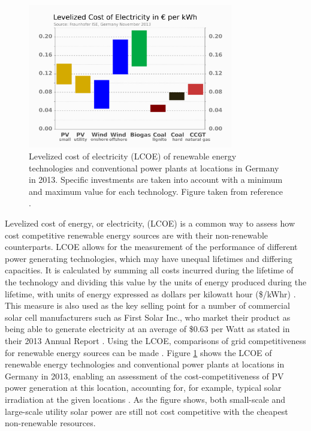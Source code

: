 \begin{figure}[h!]
  \centering
    \includegraphics[width=0.8\textwidth]{figures/LCOE.png}
    \caption{Levelized cost of electricity (LCOE) of renewable energy technologies and conventional power plants at locations in Germany in 2013.  Specific investments are taken into account with a minimum and maximum value for each technology. Figure taken from reference .}
  \label{LCOE}
\end{figure}

Levelized cost of energy, or electricity, (LCOE) is a common way to assess how cost competitive renewable energy sources are with their non-renewable counterparts. LCOE allows for the measurement of the performance of different power generating technologies, which may have unequal lifetimes and differing capacities. It is calculated by summing all costs incurred during the lifetime of the technology and dividing this value by the units of energy produced during the lifetime, with units of energy expressed as dollars per kilowatt hour (\$/kWhr) \cite{LCOE2}. This measure is also used as the key selling point for a number of commercial solar cell manufacturers such as First Solar Inc., who market their product as being able to generate electricity at an average of \$0.63 per Watt as stated in their 2013  Annual Report \cite{first_solar}. Using the LCOE, comparisons of grid competitiveness for renewable energy sources can be made \cite{LCOE2}. Figure \ref{LCOE} shows the LCOE of renewable energy technologies and conventional power plants at locations in Germany in 2013, enabling an assessment of the cost-competitiveness of PV power generation at this location, accounting for, for example, typical solar irradiation at the given locations \cite{LCOE}. As the figure shows, both small-scale and large-scale utility solar power are still not cost competitive with the cheapest non-renewable resources.\\


